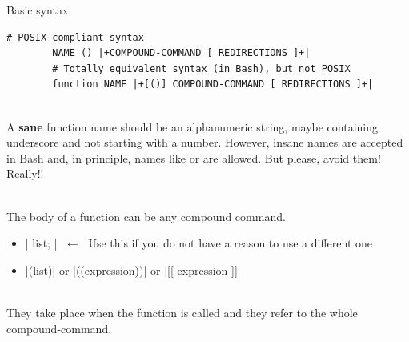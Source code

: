 \begin{frame}[fragile]{Basic syntax}
    \begin{lstlisting}[style=MyBash, numbers=none]
        # POSIX compliant syntax
        NAME () |+COMPOUND-COMMAND [ REDIRECTIONS ]+|
        # Totally equivalent syntax (in Bash), but not POSIX
        function NAME |+[()] COMPOUND-COMMAND [ REDIRECTIONS ]+|
    \end{lstlisting}
    \vspace{1mm}
    \begin{description}[X]
        \setlength{\itemsep}{3mm}
        \item[\textbf{NAME:}] ~\\
            A \textbf{sane} function name should be an alphanumeric string, maybe containing underscore and not starting with a number.
            However, insane names are accepted in Bash and, in principle, names like \PB{\texttt{:}} or \PB{\texttt{[\}\{}} are allowed.
            But please, avoid them! Really!! 
        \item[\textbf{COMPOUND-COMMAND:}] ~\\
            The body of a function can be any compound command.
            \begin{itemize}
                \item \bash|{ list; }| \alert{$\;\longleftarrow\;$ Use this if you do not have a reason to use a different one}
                \item \bash|(list)| or \bash|((expression))| or \bash|[[ expression ]]|
            \end{itemize}
        \item[\textbf{REDIRECTIONS:}] ~\\
            They take place when the function is called and they refer to the whole compound-command.
    \end{description}
\end{frame}
